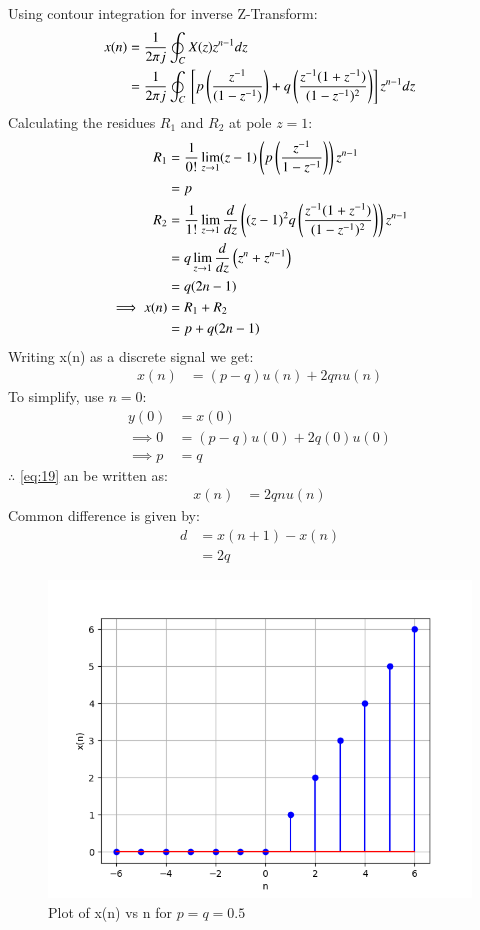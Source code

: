 \documentclass[journal,12pt,twocolumn]{IEEEtran}
\theoremstyle{remark}
\begin{document}
Using contour integration for inverse Z-Transform:
\begin{align}
    x(n) &= \frac{1}{2\pi j} \oint_C X(z) z^{n-1}dz\\
    &= \frac{1}{2 \pi j} \oint_C  {}\left[p\left(\frac{z^{-1}}{(1-z^{-1})}\right) + q\left(\frac{z^{-1}(1 + z^{-1})}{(1-z^{-1})^2}\right)\right]z^{n-1}dz
\end{align}
Calculating the residues $R_1$ and $R_2$ at pole $z=1$:
\begin{align}
    R_1 &= \frac{1}{0!} \lim_{z \to 1}(z-1)\left(p\left(\frac{z^{-1}}{1-z^{-1}}\right)\right)z^{n-1}\\
    &= p\\
    R_2 &= \frac{1}{1!} \lim_{z \to 1}\frac{d}{dz}\left((z-1)^2q\left(\frac{z^{-1}(1 + z^{-1})}{(1-z^{-1})^2}\right)\right)z^{n-1}\\
    &= q\lim_{z \to 1}\frac{d}{dz}\left(z^{n} + z^{n-1}\right)\\
    &= q(2n-1)\\
    \implies x(n) &= R_1 + R_2\\
    &= p + q(2n-1)
\end{align}
Writing x(n) as a discrete signal we get:
\begin{align}
    x(n) &= (p-q)u(n) + 2qnu(n)\label{eq:19}
\end{align}
To simplify, use $n=0$:
\begin{align}
    y(0)&=x(0)\\
    \implies 0 &= (p-q)u(0) +2q(0)u(0)\\
    \implies p &= q
\end{align}
$\therefore$ \eqref{eq:19} an be written as:
\begin{align}
    x(n) &= 2qnu(n)
\end{align}
Common difference is given by:
\begin{align}
    d &= x(n+1) - x(n)\\
    &= 2q
\end{align}
\begin{figure}[!h]
    \centering
    \includegraphics[width = \columnwidth]{figs/x_plot.png}
    \caption{Plot of x(n) vs n for $p=q=0.5$}
    \label{fig:1}
\end{figure}
\end{document}
